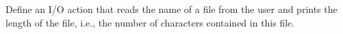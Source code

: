 \begin{exercise}
Define an I/O action  that reads the name
of a file from the user and prints the length of the file,
i.e., the number of characters contained in this file.
\end{exercise}



